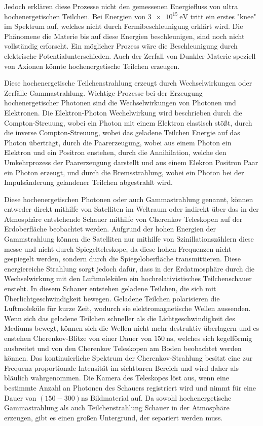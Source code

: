Jedoch erklären diese Prozesse nicht den gemessenen Energiefluss von ultra hochenergetischen Teilchen. Bei Energien von $\SI{3e15}{\eV}$ tritt ein erstes
"knee" im Spektrum auf, welches nicht durch Fermibeschleunigung erklärt wird.
Die Phänomene die Materie bis auf diese Energien beschleunigen, sind noch nicht vollständig erforscht.
Ein möglicher Prozess wäre die Beschleunigung durch elektrische Potentialunterschieden.
Auch der Zerfall von Dunkler Materie speziell von Axionen könnte hochenergetische Teilchen erzeugen.

Diese hochenergetische Teilchenstrahlung erzeugt durch Wechselwirkungen oder Zerfälle Gammastrahlung.
Wichtige Prozesse bei der Erzeugung hochenergetischer Photonen sind die Wechselwirkungen von Photonen und Elektronen.
Die Elektron-Photon Wechelwirkung wird beschrieben durch die
Compton-Streuung, wobei ein Photon mit einem Elektron elastisch stößt, durch die inverse Compton-Streuung, wobei das geladene Teilchen Energie auf das Photon
überträgt, durch die Paarerzeugung, wobei aus einem Photon ein Elektron
und ein Positron enstehen, durch die Annihilation, welche den Umkehrprozess der Paarerzeugung darstellt und aus einem Elekron Positron Paar
ein Photon erzeugt, und durch die Bremsstrahlung, wobei ein Photon bei der Impulsänderung gelandener Teilchen abgestrahlt wird.

Diese hochenergetischen Photonen oder auch Gammastrahlung genannt, können entweder direkt mithilfe von Satelliten im Weltraum oder indirekt über das in
der Atmosphäre entstehende Schauer mithilfe von Cherenkov Teleskopen auf der Erdoberfläche beobachtet werden.
Aufgrund der hohen Energien der Gammstrahlung können die Satelliten nur mithilfe von Szinillationszählern diese messe und nicht durch Spiegelteleskope,
da diese hohen Frequenzen nicht gespiegelt werden, sondern durch die Spiegeloberfläche transmittieren.
Diese energiereiche Strahlung sorgt jedoch dafür, dass in der Erdatmosphäre durch die Wechselwirkung mit den Luftmolekülen ein hochrelativistisches
Teilchenschauer ensteht.
In diesem Schauer entstehen geladene Teilchen, die sich mit Überlichtgeschwindigkeit bewegen.
Geladene Teilchen polarisieren die Luftmoleküle für kurze Zeit, wodurch sie elektromagnetische Wellen aussenden.
Wenn sich das geladene Teilchen schneller als die Lichtgeschwindigkeit des Mediums bewegt, können sich die Wellen nicht mehr destruktiv
überlagern und es enstehen Cherenkov-Blitze von einer Dauer von $\SI{150}{\nano\s}$\cite{Cherenkov_Licht}, welches sich kegelförmig ausbreitet und von den Cherenkov
Teleskopen am Boden beobachtet werden können.
Das kontinuierliche Spektrum der Cherenkov-Strahlung besitzt eine zur Frequenz proportionale Intensität im sichtbaren Bereich und
wird daher als bläulich wahrgenommen.
Die Kamera des Teleskopes löst aus, wenn eine bestimmte Anzahl an Photonen des Schauers registriert wird und nimmt
für eine Dauer von $(150-300)\si{\nano\s}$ Bildmaterial auf.
Da sowohl hochenergetische Gammastrahlung als auch Teilchenstrahlung
Schauer in der Atmosphäre erzeugen, gibt es einen großen Untergrund, der separiert werden muss.


